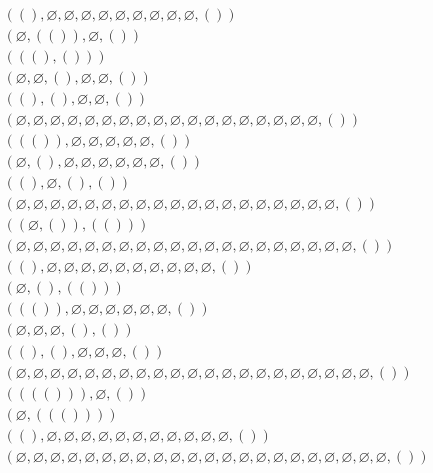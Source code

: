 \documentclass[12pt]{article}
\def\qua{()}
\newcommand{\quat}[1]{\left( #1 \right)}
\def\nul{\varnothing}
\begin{document}
\begin{align*}
&\quat{\qua,\nul,\nul,\nul,\nul,\nul,\nul,\nul,\nul,\nul,\qua}\\
&\quat{\nul,\quat{\qua},\nul,\qua}\\
&\quat{\quat{\qua,\qua}}\\
&\quat{\nul,\nul,\qua,\nul,\nul,\qua}\\
&\quat{\qua,\qua,\nul,\nul,\qua}\\
&\quat{\nul,\nul,\nul,\nul,\nul,\nul,\nul,\nul,\nul,\nul,\nul,\nul,\nul,\nul,\nul,\nul,\nul,\nul,\qua}\\
&\quat{\quat{\qua},\nul,\nul,\nul,\nul,\nul,\qua}\\
&\quat{\nul,\qua,\nul,\nul,\nul,\nul,\nul,\nul,\qua}\\
&\quat{\qua,\nul,\qua,\qua}\\
&\quat{\nul,\nul,\nul,\nul,\nul,\nul,\nul,\nul,\nul,\nul,\nul,\nul,\nul,\nul,\nul,\nul,\nul,\nul,\nul,\qua}\\
&\quat{\quat{\nul,\qua},\quat{\qua}}\\
&\quat{\nul,\nul,\nul,\nul,\nul,\nul,\nul,\nul,\nul,\nul,\nul,\nul,\nul,\nul,\nul,\nul,\nul,\nul,\nul,\nul,\qua}\\
&\quat{\qua,\nul,\nul,\nul,\nul,\nul,\nul,\nul,\nul,\nul,\nul,\qua}\\
&\quat{\nul,\qua,\quat{\qua}}\\
&\quat{\quat{\qua},\nul,\nul,\nul,\nul,\nul,\nul,\qua}\\
&\quat{\nul,\nul,\nul,\qua,\qua}\\
&\quat{\qua,\qua,\nul,\nul,\nul,\qua}\\
&\quat{\nul,\nul,\nul,\nul,\nul,\nul,\nul,\nul,\nul,\nul,\nul,\nul,\nul,\nul,\nul,\nul,\nul,\nul,\nul,\nul,\nul,\qua}\\
&\quat{\quat{\quat{\qua}},\nul,\qua}\\
&\quat{\nul,\quat{\quat{\qua}}}\\
&\quat{\qua,\nul,\nul,\nul,\nul,\nul,\nul,\nul,\nul,\nul,\nul,\nul,\qua}\\
&\quat{\nul,\nul,\nul,\nul,\nul,\nul,\nul,\nul,\nul,\nul,\nul,\nul,\nul,\nul,\nul,\nul,\nul,\nul,\nul,\nul,\nul,\nul,\qua}\\
\end{align*}
\end{document}
